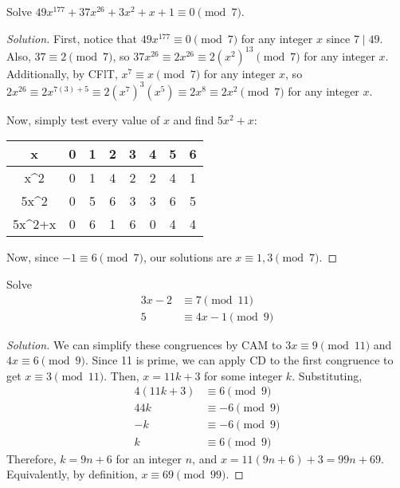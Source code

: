 \documentclass{agony}
\begin{document}
\question Solve $49x^{177} + 37x^{26} + 3x^2 + x + 1 \equiv 0 \pmod 7$.
\begin{proof}[Solution]
  First, notice that $49x^{177} \equiv 0 \pmod 7$ for any integer $x$ since $7 \mid 49$.
  Also, $37 \equiv 2 \pmod 7$, so $37x^{26} \equiv 2x^{26} \equiv 2(x^2)^{13} \pmod 7$ for any integer $x$.
  Additionally, by CFlT, $x^{7} \equiv x \pmod 7$ for any integer $x$, so $2x^{26} \equiv 2x^{7(3)+5} \equiv 2(x^7)^{3}(x^5) \equiv 2x^8 \equiv 2x^2 \pmod 7$ for any integer $x$.

  Now, simply test every value of $x$ and find $5x^2 + x$:
  \begin{center}
    \begin{tabular}{C|C|C|C|C|C|C|C}
      x               & 0 & 1 & 2 & 3 & 4 & 5 & 6 \\ \hline
      x^2             & 0 & 1 & 4 & 2 & 2 & 4 & 1 \\
      5x^2            & 0 & 5 & 6 & 3 & 3 & 6 & 5 \\ \hline
      5x^2+x          & 0 & 6 & 1 & 6 & 0 & 4 & 4
    \end{tabular}
  \end{center}
  Now, since $-1 \equiv 6 \pmod7$, our solutions are $x \equiv 1,3 \pmod7$.
\end{proof}


\question Solve \begin{align*}
  3x - 2 & \equiv 7 \pmod{11}     \\
  5      & \equiv 4x - 1 \pmod{9}
\end{align*}
\begin{proof}[Solution]
  We can simplify these congruences by CAM to $3x \equiv 9 \pmod{11}$ and $4x \equiv 6 \pmod{9}$.
  Since 11 is prime, we can apply CD to the first congruence to get $x \equiv 3 \pmod{11}$.
  Then, $x = 11k + 3$ for some integer $k$. Substituting,
  \begin{align*}
    4(11k+3) & \equiv 6 \pmod{9}  \\
    44k      & \equiv -6 \pmod{9} \\
    -k       & \equiv -6 \pmod{9} \\
    k        & \equiv 6 \pmod{9}
  \end{align*}
  Therefore, $k = 9n + 6$ for an integer $n$, and $x = 11(9n+6) + 3 = 99n + 69$.
  Equivalently, by definition, $x \equiv 69 \pmod{99}$.
\end{proof}
\end{document}
